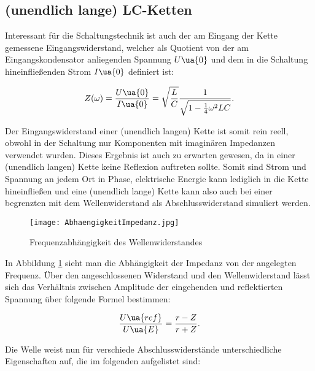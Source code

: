 \subsection{(unendlich lange) LC-Ketten}

Interessant für die Schaltungstechnik ist auch der am Eingang der Kette gemessene
Eingangswiderstand, welcher als Quotient von der am Eingangskondensator anliegenden
Spannung $U\ua{0}$ und dem in die Schaltung hineinfließenden Strom $I\ua{0}$
definiert ist:

\begin{equation}
  Z(\omega) = \frac{U\ua{0}}{I\ua{0}} = \sqrt{ \frac{L}{C}} \frac{1}{ \sqrt{1 - \frac{1}{4} \omega^2 LC} }.
\end{equation}

Der Eingangswiderstand einer (unendlich langen) Kette ist somit rein reell,
obwohl in der Schaltung nur Komponenten mit imaginären Impedanzen verwendet wurden.
Dieses Ergebnis ist auch zu erwarten gewesen, da in einer (unendlich langen) Kette
keine Reflexion auftreten sollte. Somit sind Strom und Spannung an jedem Ort in
Phase, elektrische Energie kann lediglich in die Kette hineinfließen und eine
(unendlich lange) Kette kann also auch bei einer begrenzten mit dem Wellenwiderstand
als Abschlusswiderstand simuliert werden.

\begin{figure}
  \texttt{[image: AbhaengigkeitImpedanz.jpg]}
  \caption{Frequenzabhängigkeit des Wellenwiderstandes \cite{anleitung01}}
  \label{fig:Impedanzabhängigkeit}
\end{figure}

In Abbildung \ref{fig:Impedanzabhängigkeit} sieht man die Abhängigkeit der Impedanz
von der angelegten Frequenz.
Über den angeschlossenen Widerstand und den Wellenwiderstand lässt sich das
Verhältnis zwischen Amplitude der eingehenden und reflektierten Spannung über folgende
Formel bestimmen:

\begin{equation}
  \frac{U\ua{ref}}{U\ua{E}} = \frac{r - Z}{r + Z}.
\end{equation}


Die Welle weist nun für verschiede Abschlusswiderstände unterschiedliche
Eigenschaften auf, die im folgenden aufgelistet sind:


